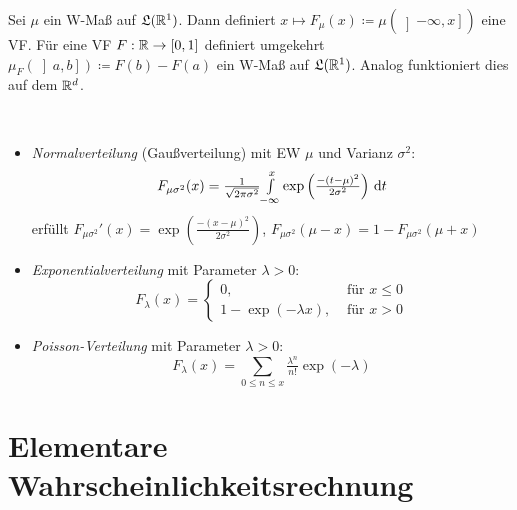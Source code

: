\documentclass{cheat-sheet}
\newcommand{\LebAlg}{\mathfrak{L}} %
\begin{document}




\begin{bem}
  Sei $\mu$ ein W-Maß auf $\LebAlg(\R^1)$. Dann definiert $x \mapsto F_{\mu}(x) \coloneqq \mu(\left] -\infty, x \right])$ eine VF. Für eine VF $F : \mathbb{R} \to [0,1]$ definiert umgekehrt $\mu_F(\left] a, b \right]) \coloneqq F(b) - F(a)$ ein W-Maß auf $\LebAlg(\R^1)$. Analog funktioniert dies auf dem $\mathbb{R}^d$.
\end{bem}


\begin{defn}\mbox{}\\
  \begin{itemize}
    \item \emph{Normalverteilung} (Gaußverteilung) mit EW $\mu$ und Varianz $\sigma^2$:
    \[ F_{\mu \sigma^2}(x) = \tfrac{1}{\sqrt{2 \pi \sigma^2}} {\textstyle \int\limits_{-\infty}^{x}} \exp\left(\tfrac{-(t-\mu)^2}{2 \sigma^2}\right) \,\mathrm{d} t \]
    erfüllt $F_{\mu \sigma^2}'(x) = \exp\left(\tfrac{-(x-\mu)^2}{2 \sigma^2}\right)$, $F_{\mu \sigma^2}(\mu-x) = 1 - F_{\mu \sigma^2}(\mu+x)$
    \item \emph{Exponentialverteilung} mit Parameter $\lambda > 0$:
    \[ F_{\lambda}(x) = \begin{cases} 0, & \text{ für } x \leq 0 \\
                                      1 - \exp(- \lambda x), & \text{ für } x > 0
    \end{cases} \]
    \item \emph{Poisson-Verteilung} mit Parameter $\lambda > 0$:
    \[ F_{\lambda}(x) = \sum_{0 \leq n \leq x} \tfrac{\lambda^n}{n!} \exp(-\lambda) \]
  \end{itemize}
\end{defn}


\section{Elementare Wahrscheinlichkeitsrechnung}

\end{document}
